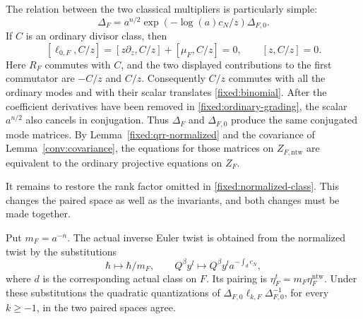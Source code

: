 The relation between the two classical multipliers is particularly
simple:
\begin{equation}\label{fixed:Delta-normalization}
 \Delta_F=a^{n/2}
       \exp\left(-\log(a)c_N/z\right)\Delta_{F,0}.
\end{equation}
If $C$ is an ordinary divisor class, then
\[
 [\ell_{0,F},C/z]=[z\partial_z,C/z]+[\mu_F,C/z]=0,
 \qquad [z,C/z]=0.
\]
Here $R_F$ commutes with $C$, and the two displayed contributions to
the first commutator are $-C/z$ and $C/z$.  Consequently $C/z$ commutes
with all the ordinary modes and with their scalar translates
\eqref{fixed:binomial}.  After the coefficient derivatives have been
removed in \eqref{fixed:ordinary-grading}, the scalar $a^{n/2}$ also
cancels in conjugation.  Thus $\Delta_F$ and $\Delta_{F,0}$ produce the
same conjugated mode matrices.  By Lemma~\ref{fixed:qrr-normalized} and
the covariance of Lemma~\ref{conv:covariance}, the equations for those
matrices on $Z_{F,\mathrm{ntw}}$ are equivalent to the ordinary projective
equations on $Z_F$.

It remains to restore the rank factor omitted in
\eqref{fixed:normalized-class}.  This changes the paired space as well
as the invariants, and both changes must be made together.

\begin{lemma}\label{fixed:rank-scaling}
Put $m_F=a^{-n}$.  The actual inverse Euler twist is obtained from the
normalized twist by the substitutions
\begin{equation}\label{fixed:scaling}
 \hbar\longmapsto\hbar/m_F,
 \qquad Q^\beta y^l\longmapsto
     Q^\beta y^l a^{-\int_d c_N},
\end{equation}
where $d$ is the corresponding actual class on $F$.  Its pairing is
$\eta_F^t=m_F\eta_F^{\mathrm{ntw}}$.  Under these substitutions the
quadratic quantizations of
$\Delta_{F,0}\ell_{k,F}\Delta_{F,0}^{-1}$, for every $k\geq-1$, in the
two paired spaces agree.
\end{lemma}

